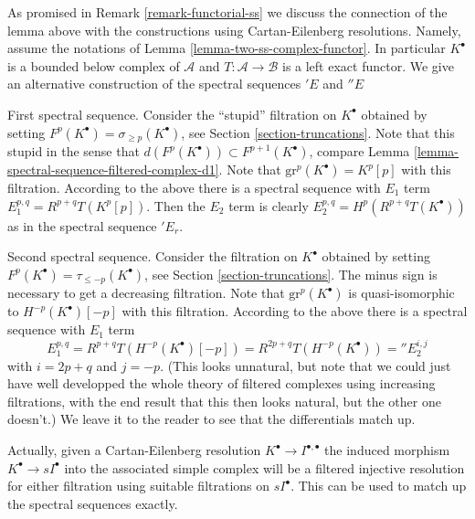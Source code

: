 \begin{remark}
\label{remark-final-functorial}
As promised in Remark \ref{remark-functorial-ss} we discuss the
connection of the lemma
above with the constructions using Cartan-Eilenberg resolutions.
Namely, assume the notations of Lemma \ref{lemma-two-ss-complex-functor}.
In particular $K^\bullet$ is a bounded below complex of
$\mathcal{A}$ and $T : \mathcal{A} \to \mathcal{B}$ is a
left exact functor. We give an alternative construction of the
spectral sequences ${}'E$ and ${}''E$ 

\medskip\noindent
First spectral sequence. Consider the ``stupid'' filtration
on $K^\bullet$
obtained by setting $F^p(K^\bullet) = \sigma_{\geq p}(K^\bullet)$,
see Section \ref{section-truncations}.
Note that this stupid in the sense that
$d(F^p(K^\bullet)) \subset F^{p + 1}(K^\bullet)$, compare
Lemma \ref{lemma-spectral-sequence-filtered-complex-d1}.
Note that $\text{gr}^p(K^\bullet) = K^p[p]$ with this filtration.
According to the above there is a spectral sequence
with $E_1$ term $E_1^{p, q} = R^{p + q}T(K^p[p])$.
Then the $E_2$ term is clearly $E_2^{p, q} = H^p(R^{p + q}T(K^\bullet))$
as in the spectral sequence ${}'E_r$.

\medskip\noindent
Second spectral sequence. Consider the filtration on $K^\bullet$
obtained by setting $F^p(K^\bullet) = \tau_{\leq -p}(K^\bullet)$,
see Section \ref{section-truncations}. The minus sign is necessary
to get a decreasing filtration. Note that
$\text{gr}^p(K^\bullet)$ is quasi-isomorphic to $H^{-p}(K^\bullet)[-p]$
with this filtration. According to the above there is a spectral sequence
with $E_1$ term
$$
E_1^{p, q}
= R^{p + q}T(H^{-p}(K^\bullet)[-p])
= R^{2p + q}T(H^{-p}(K^\bullet)) = {}''E_2^{i, j}
$$
with $i = 2p + q$ and $j = -p$. (This looks unnatural, but note that we
could just have well developped the whole theory of filtered complexes
using increasing filtrations, with the end result that this then looks
natural, but the other one doesn't.) We leave it to the reader to see
that the differentials match up.

\medskip\noindent
Actually, given a Cartan-Eilenberg resolution
$K^\bullet \to I^{\bullet, \bullet}$ the induced morphism
$K^\bullet \to sI^\bullet$ into the associated simple complex
will be a filtered injective resolution for either filtration
using suitable filtrations on $sI^\bullet$. This can be used
to match up the spectral sequences exactly.
\end{remark}






















